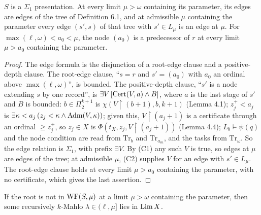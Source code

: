 \documentclass[11pt]{article}
\begin{document}
\begin{statement} $S$ is a $\Sigma_1$ presentation. At every limit $\mu > \omega$ containing its
parameter, its edges are edges of the tree of Definition 6.1, and at admissible $\mu$ containing the parameter every edge $(s', s)$
of that tree with $s' \in L_\mu$ is an edge at $\mu$. For $\max(\ell,\omega) < a_0 < \mu$, the node $(a_0)$ is a predecessor of $r$
at every limit $\mu > a_0$ containing the parameter.
\end{statement}

\begin{proof}
The edge formula is the disjunction of a root-edge clause and a positive-depth clause. The root-edge clause, ``$s =
r$ and $s' = (a_0)$ with $a_0$ an ordinal above $\max(\ell, \omega)$'', is bounded. The positive-depth clause, ``$s'$
is a node extending $s$ by one record'', is $\exists V\, [\mathrm{Cert}(V, a) \wedge B]$, where $a$ is the last stage of $s'$ and
$B$ is bounded: $b \in \Pi_2^{k+1}$ is $\chi(V{\restriction}(b+1), b, k+1)$ (Lemma 4.1); $z_j^+ < a_j$ is $\exists
\kappa < a_j\, (z_j < \kappa \wedge \mathrm{Adm}(V, \kappa))$; given this, $V{\restriction}(a_j+1)$ is a certificate through an
ordinal $\ge z_j^+$, so $z_j \in X$ is $\Phi(t_X, z_j, V{\restriction}(a_j+1))$ (Lemma 4.4); $L_b \models \psi(q)$
and the node condition are read from $\mathrm{Tr}_b$ and $\mathrm{Tr}_{a_m}$, and the tasks from $\mathrm{Tr}_\omega$.
So the edge relation is $\Sigma_1$, with prefix $\exists V$. By (C1) any such $V$ is true, so edges at $\mu$ are edges
of the tree; at admissible $\mu$, (C2) supplies $V$ for an edge with $s' \in L_\mu$. The root-edge clause holds at every limit $\mu > a_0$ containing the parameter, with no certificate, which gives
the last assertion.
\end{proof}

\begin{statement} If the root is not in $\mathrm{WF}(S, \mu)$ at a limit $\mu > \omega$ containing the
parameter, then some recursively $k$-Mahlo $\lambda \in (\ell, \mu]$ lies in $\mathrm{Lim}\, X$.
\end{statement}
\end{document}
